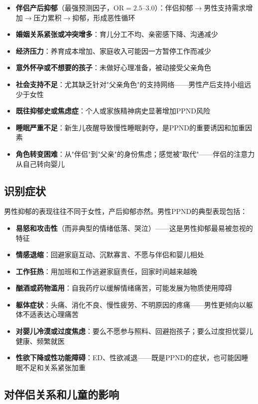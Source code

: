 \begin{itemize}[leftmargin=2cm]
	\item \textbf{伴侣产后抑郁}（最强预测因子，OR$=2.5$--3.0）：伴侣抑郁$\rightarrow$男性支持需求增加$\rightarrow$压力累积$\rightarrow$抑郁，形成恶性循环
	\item \textbf{婚姻关系紧张或冲突增多}：育儿分工不均、亲密感下降、沟通减少
	\item \textbf{经济压力}：养育成本增加、家庭收入可能因一方暂停工作而减少
	\item \textbf{意外怀孕或不想要的孩子}：未做好心理准备，被动接受父亲角色
	\item \textbf{社会支持不足}：尤其缺乏针对"父亲角色"的支持网络——男性产后支持小组远少于女性
	\item \textbf{既往抑郁史或焦虑症}：个人或家族精神病史显著增加PPND风险
	\item \textbf{睡眠严重不足}：新生儿夜醒导致慢性睡眠剥夺，是PPND的重要诱因和加重因素
	\item \textbf{角色转变困难}：从"伴侣"到"父亲"的身份焦虑；感觉被"取代"——伴侣的注意力从自己转向婴儿
\end{itemize}

\subsection{识别症状}

男性抑郁的表现往往不同于女性，产后抑郁亦然。男性PPND的典型表现包括：

\begin{itemize}[leftmargin=2cm]
	\item \textbf{易怒和攻击性}（而非典型的情绪低落、哭泣）——这是男性抑郁最易被忽视的特征
	\item \textbf{情感退缩}：回避家庭互动、沉默寡言、不愿与伴侣和婴儿相处
	\item \textbf{工作狂热}：用加班和工作逃避家庭责任，回家时间越来越晚
	\item \textbf{酗酒或药物滥用}：自我药疗以缓解情绪痛苦，可能发展为物质使用障碍
	\item \textbf{躯体症状}：头痛、消化不良、慢性疲劳、不明原因的疼痛——男性更倾向以躯体不适表达心理痛苦
	\item \textbf{对婴儿冷漠或过度焦虑}：要么不愿参与照料、回避抱孩子；要么过度担忧婴儿健康、频繁就医
	\item \textbf{性欲下降或性功能障碍}：ED、性欲减退——既是PPND的症状，也可能因睡眠不足和关系紧张加重
\end{itemize}

\subsection{对伴侣关系和儿童的影响}

